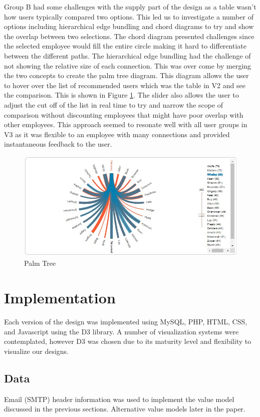 \documentclass[journal]{vgtc}                %
\begin{document}
Group B had some challenges with the supply part of the design as a table wasn't how users typically compared two options.  This led us to investigate a number of options including hierarchical edge bundling and chord diagrams to try and show the overlap between two selections.  The chord diagram presented challenges since the selected employee would fill the entire circle making it hard to differentiate between the different paths.  The hierarchical edge bundling had the challenge of not showing the relative size of each connection.  This was over come by merging the two concepts to create the palm tree diagram.  This diagram allows the user to hover over the list of recommended users which was the table in V2 and see the comparison.  This is shown in Figure \ref{fig:palm}.  The slider also allows the user to adjust the cut off of the list in real time to try and narrow the scope of comparison without discounting employees that might have poor overlap with other employees.  This approach seemed to resonate well with all user groups in V3 as it was flexible to an employee with many connections and provided instantaneous feedback to the user. 

\begin{figure}
	\centering
	\includegraphics[width=\columnwidth]{pictures/palmtree.jpg}
	\caption{Palm Tree}
	\label{fig:palm}
\end{figure}

\section{Implementation}
\label{sec:implementation}
Each version of the design was implemented using MySQL, PHP, HTML, CSS, and Javascript using the D3 library.  A number of visualization systems were contemplated, however D3 was chosen due to its maturity level and flexibility to visualize our designs.

\subsection{Data}
Email (SMTP) header information was used to implement the value model discussed in the previous sections.  Alternative value models later in the paper.
\end{document}
